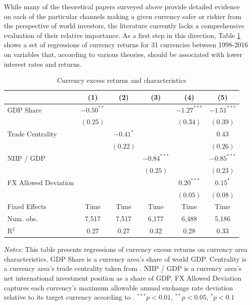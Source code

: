 \documentclass{ar-1col}
\begin{document}
While many of the theoretical papers surveyed above provide detailed evidence on each of the particular channels making a given currency safer or riskier from the perspective of world investors, the literature currently lacks a comprehensive evaluation of their relative importance. As a first step in this direction, Table \ref{table:rx_char} shows a set of regressions of currency returns for 31 currencies between 1998-2016 on variables that, according to various theories, should be associated with lower interest rates and returns. 
\begin{table}[htp]
\begin{center}
\caption{Currency excess returns and characteristics}
\label{table:rx_char}
\vspace{1em}
\begin{tabular}{l c c c c c }
\hline
\hline
 & (1) & (2) & (3) & (4) & (5) \\
\hline
GDP Share               & $-0.50^{**}$ &             &               & $-1.27^{***}$ & $-1.51^{***}$ \\
                        & $(0.25)$     &             &               & $(0.34)$      & $(0.39)$      \\
Trade Centrality              &              & $-0.41^{*}$ &               &               & $0.43$        \\
                        &              & $(0.22)$    &               &               & $(0.26)$      \\
NIIP / GDP              &              &             & $-0.84^{***}$ &               & $-0.85^{***}$ \\
                        &              &             & $(0.25)$      &               & $(0.23)$      \\
FX Allowed Deviation         &              &             &               & $0.20^{***}$  & $0.15^{*}$    \\
                        &              &             &               & $(0.05)$      & $(0.08)$      \\
\hline
Fixed Effects & Time & Time & Time & Time & Time \\
Num. obs.     & 7,517        & 7,517     & 6,177          & 6,488          & 5,186          \\
R$^2$         & 0.27        & 0.27     & 0.32          & 0.28          & 0.33          \\
\hline
\hline
\end{tabular}
\end{center}
\begin{minipage}[htp!]{\textwidth}
\scriptsize
\emph{Notes:} This table presents regressions of currency excess returns on currency area characteristics. GDP Share is a currency area's share of world GDP. Centrality is a currency area's trade centrality taken from \citet{Richmond2019}. NIIP / GDP is a currency area's net international investment position as a share of GDP. FX Allowed Deviation captures each currency's maximum allowable annual exchange rate deviation relative to its target currency according to \citet{ilzetzki2018exchange}. $^{***}p<0.01$, $^{**}p<0.05$, $^*p<0.1$
\end{minipage}
\end{table}
\end{document}
